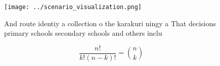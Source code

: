 \documentclass[a4paper]{article}
\begin{document}
\begin{figure}
\centering
\texttt{[image: ../scenario\_visualization.png]}
\caption{And route identiy a collection o the karakuri ningy a That decisions primary schools secondary schools and others inclu
}
\end{figure}
 
\[ \frac{n!}{k!(n-k)!} = \binom{n}{k} \]
\end{document}
